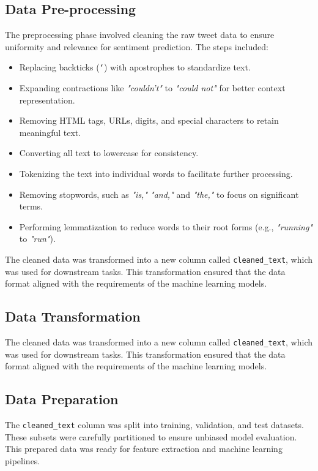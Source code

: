 \documentclass[journal]{IEEEtran}
\begin{document}
\subsection{\textbf{Data Pre-processing}}
The preprocessing phase involved cleaning the raw tweet data to ensure uniformity and relevance for sentiment prediction. The steps included:
\begin{itemize}
    \item Replacing backticks (\texttt{`}) with apostrophes to standardize text.
    \item Expanding contractions like \textit{"couldn't"} to \textit{"could not"} for better context representation.
    \item Removing HTML tags, URLs, digits, and special characters to retain meaningful text.
    \item Converting all text to lowercase for consistency.
    \item Tokenizing the text into individual words to facilitate further processing.
    \item Removing stopwords, such as \textit{"is," "and,"} and \textit{"the,"} to focus on significant terms.
    \item Performing lemmatization to reduce words to their root forms (e.g., \textit{"running"} to \textit{"run"}).
\end{itemize}

The cleaned data was transformed into a new column called \texttt{cleaned\_text}, which was used for downstream tasks. This transformation ensured that the data format aligned with the requirements of the machine learning models.

\subsection{\textbf{Data Transformation}}
The cleaned data was transformed into a new column called \texttt{cleaned\_text}, which was used for downstream tasks. This transformation ensured that the data format aligned with the requirements of the machine learning models.

\subsection{\textbf{Data Preparation}}
The \texttt{cleaned\_text} column was split into training, validation, and test datasets. These subsets were carefully partitioned to ensure unbiased model evaluation. This prepared data was ready for feature extraction and machine learning pipelines. 
\end{document}
